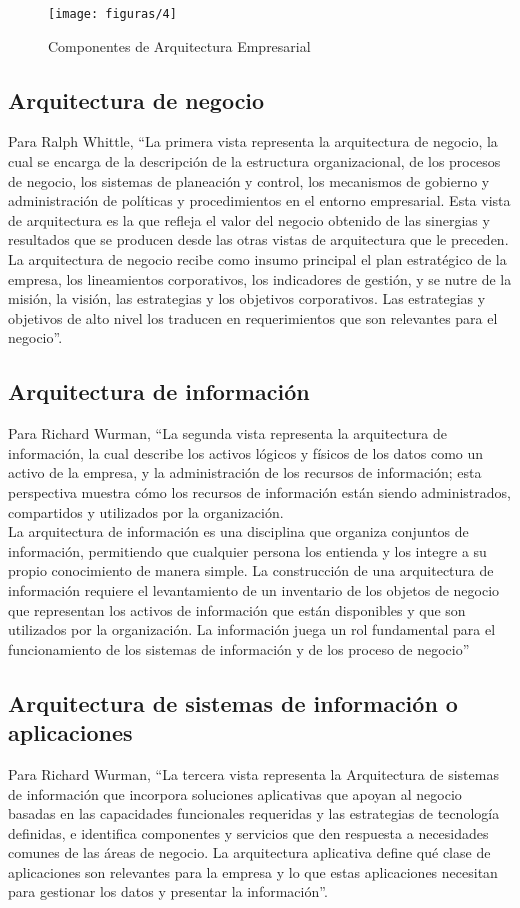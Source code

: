   \begin{figure}[H]
  	\centering
  	\texttt{[image: figuras/4]}
   	\captionsetup{width=.95\textwidth}
   	\caption{Componentes de Arquitectura Empresarial}
   	\label{figura4}
  \end{figure}
  
  \subsection{Arquitectura de negocio}
  Para Ralph Whittle, “La primera vista representa la arquitectura de negocio, la cual se encarga de la descripción de la estructura organizacional, de los procesos de negocio, los sistemas de planeación y control, los mecanismos de gobierno y administración de políticas y procedimientos en el entorno empresarial. Esta vista de arquitectura es la que refleja el valor del negocio obtenido de las sinergias y resultados que se producen desde las otras vistas de arquitectura que le preceden. La arquitectura de negocio recibe como insumo principal el plan estratégico de la empresa, los lineamientos corporativos, los indicadores de gestión, y se nutre de la misión, la visión, las estrategias y los objetivos corporativos. Las estrategias y objetivos de alto nivel los traducen en requerimientos que son relevantes para el negocio”.
  \subsection{Arquitectura de información}
  Para Richard Wurman, “La segunda vista representa la arquitectura de información, la cual describe los activos lógicos y físicos de los datos como un activo de la empresa, y la administración de los recursos de información; esta perspectiva muestra cómo los recursos de información están siendo administrados, compartidos y utilizados por la organización. \\
  La arquitectura de información es una disciplina que organiza conjuntos de información, permitiendo que cualquier persona los entienda y los integre a su propio conocimiento de manera simple. La construcción de una arquitectura de información requiere el levantamiento de un inventario de los objetos de negocio que representan los activos de información que están disponibles y que son utilizados por la organización. La información juega un rol fundamental para el funcionamiento de los sistemas de información y de los proceso de negocio”
  \subsection{Arquitectura de sistemas de información o aplicaciones}
  Para Richard Wurman, “La tercera vista representa la Arquitectura de sistemas de información que incorpora soluciones aplicativas que apoyan al negocio basadas en las capacidades funcionales requeridas y las estrategias de tecnología definidas, e identifica componentes y servicios que den respuesta a necesidades comunes de las áreas de negocio. La arquitectura aplicativa define qué clase de aplicaciones son relevantes para la empresa y lo que estas aplicaciones necesitan para gestionar los datos y presentar la información”. \cite{ref1}
